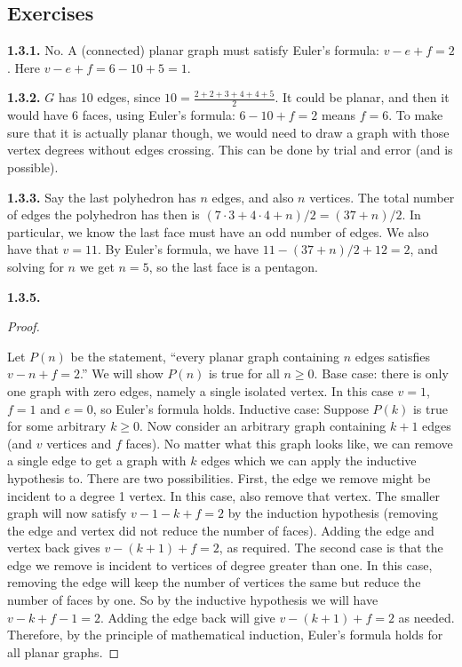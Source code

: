 \documentclass[10pt,]{book}
\theoremstyle{plain}
\theoremstyle{definition}
\theoremstyle{definition}
\theoremstyle{definition}
\theoremstyle{definition}
\numberwithin{equation}{chapter}
\begin{document}
\subsection*{ Exercises}
\noindent\textbf{1.3.1.} \hypertarget{p-224}{}%
No. A (connected) planar graph must satisfy Euler's formula: \(v - e + f = 2\). Here \(v - e + f = 6 - 10 + 5 = 1\).%
\par\smallskip
\noindent\textbf{1.3.2.} \hypertarget{p-226}{}%
\(G\) has 10 edges, since \(10 = \frac{2+2+3+4+4+5}{2}\). It could be planar, and then it would have 6 faces, using Euler's formula: \(6-10+f = 2\) means \(f = 6\).  To make sure that it is actually planar though, we would need to draw a graph with those vertex degrees without edges crossing.  This can be done by trial and error (and is possible).%
\par\smallskip
\noindent\textbf{1.3.3.} \hypertarget{p-228}{}%
Say the last polyhedron has \(n\) edges, and also \(n\) vertices. The total number of edges the polyhedron has then is \((7 \cdot 3 + 4 \cdot 4 + n)/2 = (37 + n)/2\). In particular, we know the last face must have an odd number of edges. We also have that \(v = 11 \).  By Euler's formula, we have \(11 - (37+n)/2 + 12 = 2\), and solving for \(n\) we get \(n = 5\), so the last face is a pentagon.%
\par\smallskip
\noindent\textbf{1.3.5.} \begin{proof}\hypertarget{proof-3}{}
\hypertarget{p-234}{}%
Let \(P(n)\) be the statement, ``every planar graph containing \(n\) edges satisfies \(v - n + f = 2\).'' We will show \(P(n)\) is true for all \(n \ge 0\). Base case: there is only one graph with zero edges, namely a single isolated vertex. In this case \(v = 1\), \(f = 1\) and \(e = 0\), so Euler's formula holds. Inductive case: Suppose \(P(k)\) is true for some arbitrary \(k \ge 0\). Now consider an arbitrary graph containing \(k+1\) edges (and \(v\) vertices and \(f\) faces). No matter what this graph looks like, we can remove a single edge to get a graph with \(k\) edges which we can apply the inductive hypothesis to. There are two possibilities. First, the edge we remove might be incident to a degree 1 vertex. In this case, also remove that vertex. The smaller graph will now satisfy \(v-1 - k + f = 2\) by the induction hypothesis (removing the edge and vertex did not reduce the number of faces). Adding the edge and vertex back gives \(v - (k+1) + f = 2\), as required. The second case is that the edge we remove is incident to vertices of degree greater than one. In this case, removing the edge will keep the number of vertices the same but reduce the number of faces by one. So by the inductive hypothesis we will have \(v - k + f-1 = 2\). Adding the edge back will give \(v - (k+1) + f = 2\) as needed. Therefore, by the principle of mathematical induction, Euler's formula holds for all planar graphs.%
\end{proof}
\end{document}
